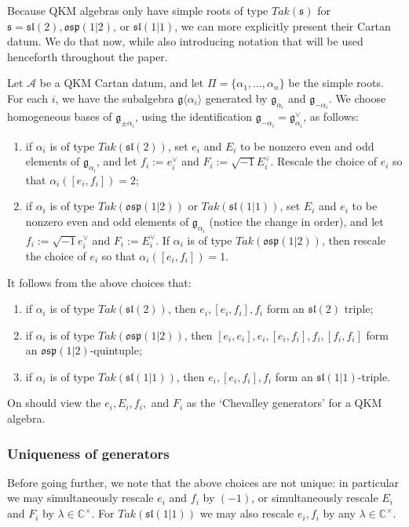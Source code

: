 \documentclass[10pt,a4paper]{amsart}
\def\AA{\mathcal{A}}
\def\C{\mathbb{C}}
\def\g{\mathfrak{g}}
\def\l{\mathfrak{l}}
\def\o{\mathfrak{o}}
\def\p{\mathfrak{p}}
\def\s{\mathfrak{s}}
\begin{document}
	Because QKM algebras only have simple roots of type $Tak(\s)$ for $\s=\s\l(2),\o\s\p(1|2)$, or $\s\l(1|1)$, we can more explicitly present their Cartan datum.  We do that now, while also introducing notation that will be used henceforth throughout the paper.
	
	Let $\AA$ be a QKM Cartan datum, and let $\Pi=\{\alpha_1,\dots,\alpha_n\}$ be the simple roots.  For each $i$, we have the subalgebra $\g\langle\alpha_i\rangle$ generated by $\g_{\alpha_i}$ and $\g_{-\alpha_i}$.  We choose homogeneous bases of $\g_{\pm\alpha_i}$, using the identification $\g_{-\alpha_i}=\g_{\alpha_i}^\vee$, as follows:
	\begin{enumerate}
		\item if $\alpha_i$ is of type $Tak(\s\l(2))$, set $e_i$ and $E_i$ to be nonzero even and odd elements of $\g_{\alpha_i}$, and let $f_i:=e_i^\vee$ and $F_i:=\sqrt{-1}E_i^\vee$.  Rescale the choice of $e_i$ so that $\alpha_i([e_i,f_i])=2$;
		\item if $\alpha_i$ is of type $Tak(\o\s\p(1|2))$ or $Tak(\s\l(1|1))$, set $E_i$ and $e_i$ to be nonzero even and odd elements of $\g_{\alpha_i}$ (notice the change in order), and let $f_i:=\sqrt{-1}e_i^\vee$ and $F_i:=E_i^\vee$.  If $\alpha_i$ is of type $Tak(\o\s\p(1|2))$, then rescale the choice of $e_i$ so that $\alpha_i([e_i,f_i])=1$.
	\end{enumerate}
	It follows from the above choices that:
	\begin{enumerate}
		\item if $\alpha_i$ is of type $Tak(\s\l(2))$, then $e_i,[e_i,f_i],f_i$ form an $\s\l(2)$ triple;
		\item if $\alpha_i$ is of type $Tak(\o\s\p(1|2))$, then $[e_i,e_i],e_i,[e_i,f_i],f_i,[f_i,f_i]$ form an $\o\s\p(1|2)$-quintuple;
		\item if $\alpha_i$ is of type $Tak(\s\l(1|1))$, then $e_i,[e_i,f_i],f_i$ form an $\s\l(1|1)$-triple.
	\end{enumerate}
	On should view the $e_i,E_i,f_i,$ and $F_i$ as the `Chevalley generators' for a QKM algebra.
	
	\subsubsection{Uniqueness of generators}\label{section_uniqueness_gens} Before going further, we note that the above choices are not unique: in particular we may simultaneously rescale $e_i$ and $f_i$ by $(-1)$, or simultaneously rescale $E_i$ and $F_i$ by $\lambda\in\C^\times$. For $Tak(\s\l(1|1))$ we may also rescale $e_i,f_i$ by any $\lambda\in\C^\times$.
	
\end{document}

